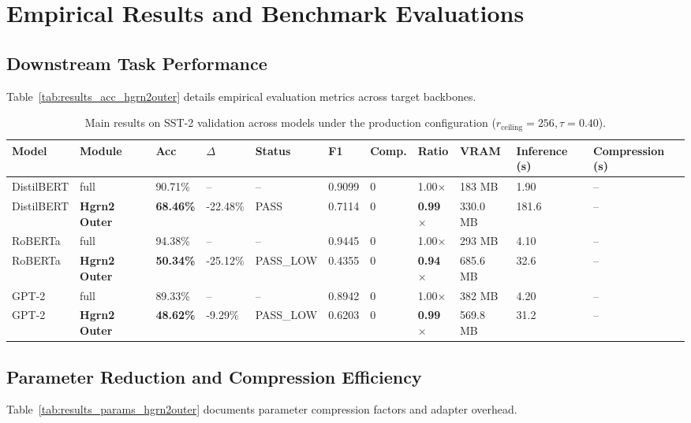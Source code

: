 \section{Empirical Results and Benchmark Evaluations}

\subsection{Downstream Task Performance}
Table~\ref{tab:results_acc_hgrn2outer} details empirical evaluation metrics across target backbones.

\begin{table}[t]
\centering
\small
\begin{tabular}{lllllllllll}
\toprule
\textbf{Model} & \textbf{Module} & \textbf{Acc} & \textbf{$\Delta$} & \textbf{Status} & \textbf{F1} & \textbf{Comp.} & \textbf{Ratio} & \textbf{VRAM} & \textbf{Inference (s)} & \textbf{Compression (s)} \\
\midrule
DistilBERT & full & 90.71\% & -- & -- & 0.9099 & 0 & 1.00$\times$ & 183 MB & 1.90 & -- \\
DistilBERT & \textbf{Hgrn2 Outer} & \textbf{68.46\%} & -22.48\% & PASS & 0.7114 & 0 & \textbf{0.99$\times$} & 330.0 MB & 181.6 & -- \\
RoBERTa & full & 94.38\% & -- & -- & 0.9445 & 0 & 1.00$\times$ & 293 MB & 4.10 & -- \\
RoBERTa & \textbf{Hgrn2 Outer} & \textbf{50.34\%} & -25.12\% & PASS\_LOW & 0.4355 & 0 & \textbf{0.94$\times$} & 685.6 MB & 32.6 & -- \\
GPT-2 & full & 89.33\% & -- & -- & 0.8942 & 0 & 1.00$\times$ & 382 MB & 4.20 & -- \\
GPT-2 & \textbf{Hgrn2 Outer} & \textbf{48.62\%} & -9.29\% & PASS\_LOW & 0.6203 & 0 & \textbf{0.99$\times$} & 569.8 MB & 31.2 & -- \\
\bottomrule
\end{tabular}
\caption{Main results on SST-2 validation across models under the production configuration ($r_{\mathrm{ceiling}}=256, \tau=0.40$).}
\label{tab:main_sst2}
\end{table}

\subsection{Parameter Reduction and Compression Efficiency}
Table~\ref{tab:results_params_hgrn2outer} documents parameter compression factors and adapter overhead.

